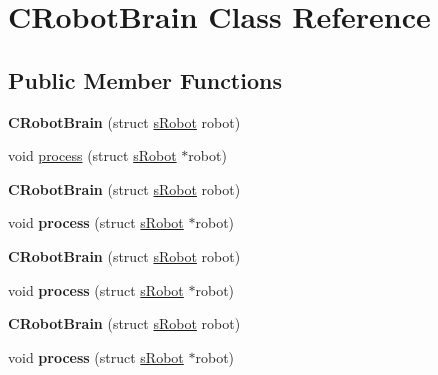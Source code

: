 \hypertarget{classCRobotBrain}{\section{C\-Robot\-Brain Class Reference}
\label{classCRobotBrain}
}
\subsection*{Public Member Functions}
\begin{DoxyCompactItemize}
\item 
\hypertarget{classCRobotBrain_ad11bce4011ff3c251c1a53caaf88020d}{{\bfseries C\-Robot\-Brain} (struct \hyperlink{structsRobot}{s\-Robot} robot)}\label{classCRobotBrain_ad11bce4011ff3c251c1a53caaf88020d}

\item 
void \hyperlink{classCRobotBrain_ad20deaef0d351b6dd4ea65ede2f7f14e}{process} (struct \hyperlink{structsRobot}{s\-Robot} $\ast$robot)
\item 
\hypertarget{classCRobotBrain_ad11bce4011ff3c251c1a53caaf88020d}{{\bfseries C\-Robot\-Brain} (struct \hyperlink{structsRobot}{s\-Robot} robot)}\label{classCRobotBrain_ad11bce4011ff3c251c1a53caaf88020d}

\item 
\hypertarget{classCRobotBrain_ad20deaef0d351b6dd4ea65ede2f7f14e}{void {\bfseries process} (struct \hyperlink{structsRobot}{s\-Robot} $\ast$robot)}\label{classCRobotBrain_ad20deaef0d351b6dd4ea65ede2f7f14e}

\item 
\hypertarget{classCRobotBrain_ad11bce4011ff3c251c1a53caaf88020d}{{\bfseries C\-Robot\-Brain} (struct \hyperlink{structsRobot}{s\-Robot} robot)}\label{classCRobotBrain_ad11bce4011ff3c251c1a53caaf88020d}

\item 
\hypertarget{classCRobotBrain_ad20deaef0d351b6dd4ea65ede2f7f14e}{void {\bfseries process} (struct \hyperlink{structsRobot}{s\-Robot} $\ast$robot)}\label{classCRobotBrain_ad20deaef0d351b6dd4ea65ede2f7f14e}

\item 
\hypertarget{classCRobotBrain_ad11bce4011ff3c251c1a53caaf88020d}{{\bfseries C\-Robot\-Brain} (struct \hyperlink{structsRobot}{s\-Robot} robot)}\label{classCRobotBrain_ad11bce4011ff3c251c1a53caaf88020d}

\item 
\hypertarget{classCRobotBrain_ad20deaef0d351b6dd4ea65ede2f7f14e}{void {\bfseries process} (struct \hyperlink{structsRobot}{s\-Robot} $\ast$robot)}\label{classCRobotBrain_ad20deaef0d351b6dd4ea65ede2f7f14e}


\end{DoxyCompactItemize}
